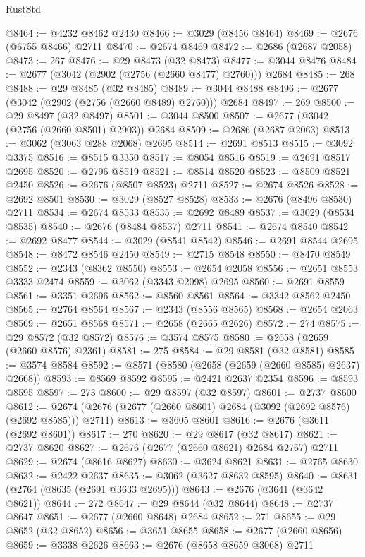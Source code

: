 \begin{lexlean}{RustStd}
\begin{coremodule}
@8464 := @4232 @8462 @2430
@8466 := @3029 (@8456 @8464)
@8469 := @2676 (@6755 @8466) @2711
@8470 := @2674 @8469
@8472 := @2686 (@2687 @2058)
@8473 := 267
@8476 := @29 @8473 (@32 @8473)
@8477 := @3044 @8476
@8484 := @2677 (@3042 (@2902 (@2756 (@2660 @8477) @2760))) @2684
@8485 := 268
@8488 := @29 @8485 (@32 @8485)
@8489 := @3044 @8488
@8496 := @2677 (@3042 (@2902 (@2756 (@2660 @8489) @2760))) @2684
@8497 := 269
@8500 := @29 @8497 (@32 @8497)
@8501 := @3044 @8500
@8507 := @2677 (@3042 (@2756 (@2660 @8501) @2903)) @2684
@8509 := @2686 (@2687 @2063)
@8513 := @3062 (@3063 @288 @2068) @2695
@8514 := @2691 @8513
@8515 := @3092 @3375
@8516 := @8515 @3350
@8517 := @8054 @8516
@8519 := @2691 @8517 @2695
@8520 := @2796 @8519
@8521 := @8514 @8520
@8523 := @8509 @8521 @2450
@8526 := @2676 (@8507 @8523) @2711
@8527 := @2674 @8526
@8528 := @2692 @8501
@8530 := @3029 (@8527 @8528)
@8533 := @2676 (@8496 @8530) @2711
@8534 := @2674 @8533
@8535 := @2692 @8489
@8537 := @3029 (@8534 @8535)
@8540 := @2676 (@8484 @8537) @2711
@8541 := @2674 @8540
@8542 := @2692 @8477
@8544 := @3029 (@8541 @8542)
@8546 := @2691 @8544 @2695
@8548 := @8472 @8546 @2450
@8549 := @2715 @8548
@8550 := @8470 @8549
@8552 := @2343 (@8362 @8550)
@8553 := @2654 @2058
@8556 := @2651 @8553 @3333 @2474
@8559 := @3062 (@3343 @2098) @2695
@8560 := @2691 @8559
@8561 := @3351 @2696
@8562 := @8560 @8561
@8564 := @3342 @8562 @2450
@8565 := @2764 @8564
@8567 := @2343 (@8556 @8565)
@8568 := @2654 @2063
@8569 := @2651 @8568
@8571 := @2658 (@2665 @2626)
@8572 := 274
@8575 := @29 @8572 (@32 @8572)
@8576 := @3574 @8575
@8580 := @2658 (@2659 (@2660 @8576) @2361)
@8581 := 275
@8584 := @29 @8581 (@32 @8581)
@8585 := @3574 @8584
@8592 := @8571 (@8580 (@2658 (@2659 (@2660 @8585) @2637) @2668))
@8593 := @8569 @8592
@8595 := @2421 @2637 @2354
@8596 := @8593 @8595
@8597 := 273
@8600 := @29 @8597 (@32 @8597)
@8601 := @2737 @8600
@8612 := @2674 (@2676 (@2677 (@2660 @8601) @2684 (@3092 (@2692 @8576) (@2692 @8585))) @2711)
@8613 := @3605 @8601
@8616 := @2676 (@3611 (@2692 @8601))
@8617 := 270
@8620 := @29 @8617 (@32 @8617)
@8621 := @2737 @8620
@8627 := @2676 (@2677 (@2660 @8621) @2684 @2767) @2711
@8629 := @2674 (@8616 @8627)
@8630 := @3624 @8621
@8631 := @2765 @8630
@8632 := @2422 @2637
@8635 := @3062 (@3627 @8632 @8595)
@8640 := @8631 (@2764 (@8635 (@2691 @3633 @2695)))
@8643 := @2676 (@3641 (@3642 @8621))
@8644 := 272
@8647 := @29 @8644 (@32 @8644)
@8648 := @2737 @8647
@8651 := @2677 (@2660 @8648) @2684
@8652 := 271
@8655 := @29 @8652 (@32 @8652)
@8656 := @3651 @8655
@8658 := @2677 (@2660 @8656)
@8659 := @3338 @2626
@8663 := @2676 (@8658 @8659 @3068) @2711

\end{coremodule}
\end{lexlean}
